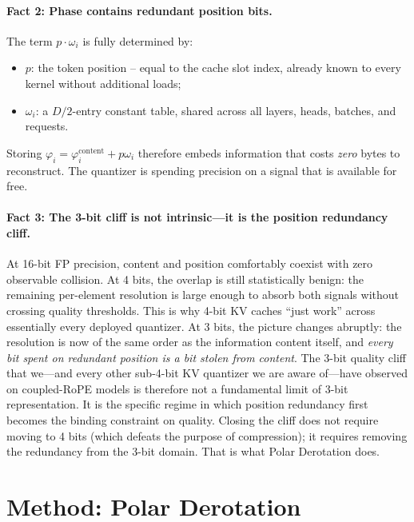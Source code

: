 \documentclass[10pt,twocolumn]{article}
\begin{document}
\paragraph{Fact 2: Phase contains redundant position bits.}
The term $p\cdot\omega_i$ is fully determined by:
\begin{itemize}[leftmargin=*,topsep=1pt,itemsep=0pt]
\item $p$: the token position -- equal to the cache slot index, already known to every kernel without additional loads;
\item $\omega_i$: a $D/2$-entry constant table, shared across all layers, heads, batches, and requests.
\end{itemize}
Storing $\varphi_i=\varphi^{\text{content}}_i+p\omega_i$ therefore embeds information that costs \emph{zero} bytes to reconstruct. The quantizer is spending precision on a signal that is available for free.

\paragraph{Fact 3: The 3-bit cliff is not intrinsic---it is the position redundancy cliff.}
At 16-bit FP precision, content and position comfortably coexist with zero observable collision. At 4 bits, the overlap is still statistically benign: the remaining per-element resolution is large enough to absorb both signals without crossing quality thresholds. This is why 4-bit KV caches ``just work'' across essentially every deployed quantizer. At 3 bits, the picture changes abruptly: the resolution is now of the same order as the information content itself, and \emph{every bit spent on redundant position is a bit stolen from content}. The 3-bit quality cliff that we---and every other sub-4-bit KV quantizer we are aware of---have observed on coupled-RoPE models is therefore not a fundamental limit of 3-bit representation. It is the specific regime in which position redundancy first becomes the binding constraint on quality. Closing the cliff does not require moving to 4 bits (which defeats the purpose of compression); it requires removing the redundancy from the 3-bit domain. That is what Polar Derotation does.

\section{Method: Polar Derotation}
\label{sec:method}
\end{document}
